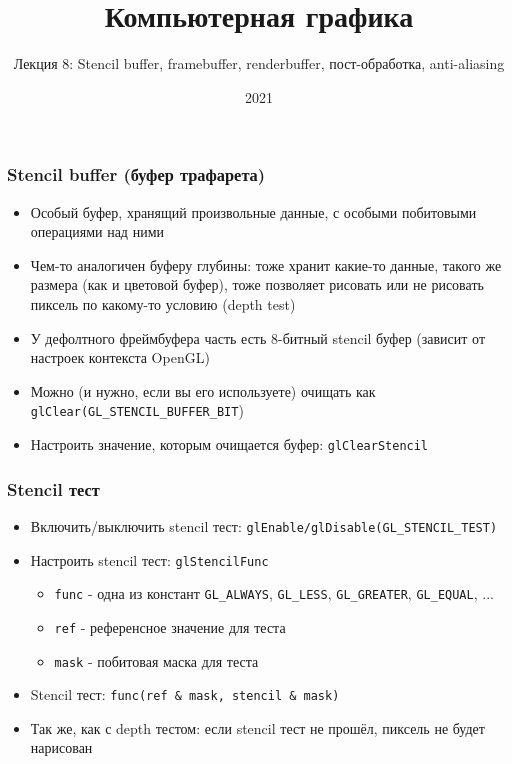 \documentclass{beamer}
\title{Компьютерная графика}
\subtitle{Лекция 8: Stencil buffer, framebuffer, renderbuffer, пост-обработка, anti-aliasing}
\date{2021}
\begin{document}
\frame{\titlepage}

\begin{frame}[fragile]
\frametitle{Stencil buffer (буфер трафарета)}
\begin{itemize}
\item Особый буфер, хранящий произвольные данные, с особыми побитовыми операциями над ними
\pause
\item Чем-то аналогичен буферу глубины: тоже хранит какие-то данные, такого же размера (как и цветовой буфер), тоже позволяет рисовать или не рисовать пиксель по какому-то условию (depth test)
\pause
\item У дефолтного фреймбуфера часть есть 8-битный stencil буфер (зависит от настроек контекста OpenGL)
\pause
\item Можно (и нужно, если вы его используете) очищать как \verb|glClear(GL_STENCIL_BUFFER_BIT|)
\pause
\item Настроить значение, которым очищается буфер: \verb|glClearStencil|
\end{itemize}
\end{frame}

\begin{frame}[fragile]
\frametitle{Stencil тест}
\begin{itemize}
\item Включить/выключить stencil тест: \verb|glEnable/glDisable(GL_STENCIL_TEST)|
\pause
\item Настроить stencil тест: \verb|glStencilFunc|
\begin{itemize}
\item \verb|func| - одна из констант \verb|GL_ALWAYS|, \verb|GL_LESS|, \verb|GL_GREATER|, \verb|GL_EQUAL|, ...
\item \verb|ref| - референсное значение для теста
\item \verb|mask| - побитовая маска для теста
\end{itemize}
\item Stencil тест: \verb|func(ref & mask, stencil & mask)|
\pause
\item Так же, как с depth тестом: если stencil тест не прошёл, пиксель не будет нарисован
\end{itemize}
\end{frame}
\end{document}
